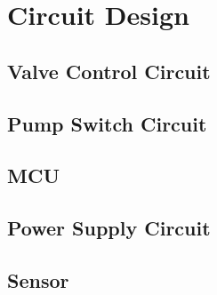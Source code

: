 \chapter{Circuit Design}
\label{chap:8}

\section{Valve Control Circuit}
\section{Pump Switch Circuit}
\section{MCU}
\section{Power Supply Circuit}
\section{Sensor}